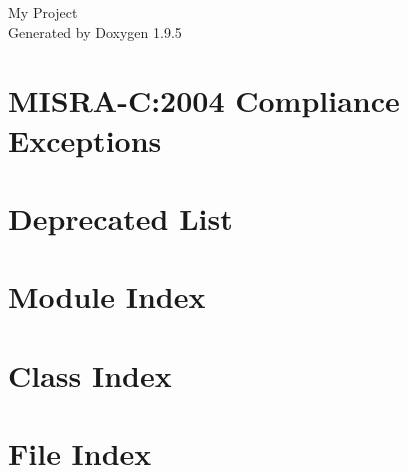 \documentclass[twoside]{book}
\newcommand{\+}{\discretionary{\mbox{\scriptsize$\hookleftarrow$}}{}{}}
\newcommand{\clearemptydoublepage}{%
    \newpage{\pagestyle{empty}\cleardoublepage}%
  }
\begin{document}
  \raggedbottom
    \hypersetup{pageanchor=false,
                bookmarksnumbered=true,
                pdfencoding=unicode
               }
  \begin{titlepage}
  \vspace*{7cm}
  \begin{center}%
  {\Large My Project}\\
  \vspace*{1cm}
  {\large Generated by Doxygen 1.9.5}\\
  \end{center}
  \end{titlepage}
  \clearemptydoublepage
  \tableofcontents
  \clearemptydoublepage
  \hypersetup{pageanchor=true}
\chapter{MISRA-\/C\+:2004 Compliance Exceptions}
\label{_c_m_s_i_s__m_i_s_r_a__exceptions}

\chapter{Deprecated List}
\label{deprecated}

\chapter{Module Index}

\chapter{Class Index}

\chapter{File Index}

\end{document}
